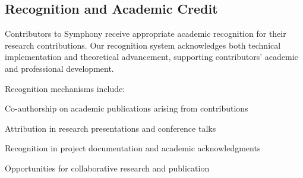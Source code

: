 \subsection*{Recognition and Academic Credit}

Contributors to Symphony receive appropriate academic recognition for their research contributions. Our recognition system acknowledges both technical implementation and theoretical advancement, supporting contributors' academic and professional development.

Recognition mechanisms include:
\begin{compactlist}
    \item Co-authorship on academic publications arising from contributions
    \item Attribution in research presentations and conference talks
    \item Recognition in project documentation and academic acknowledgments
    \item Opportunities for collaborative research and publication
\end{compactlist}
